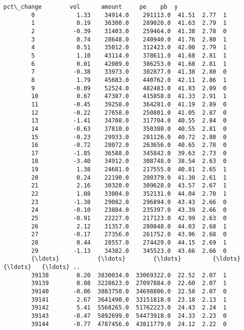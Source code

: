 \documentclass[11pt]{article}
\begin{document}
\begin{Verbatim}[commandchars=\\\{\}]
               pct\_change        vol      amount     pe    pb  y  
        0            1.33    34914.0    291113.0  41.51  2.77  1  
        1            0.19    36300.0    289020.0  41.63  2.79  1  
        2           -0.39    31403.0    259464.0  41.38  2.78  0  
        3            0.74    28648.0    240940.0  41.76  2.80  1  
        4            0.51    35012.0    312423.0  42.00  2.79  1  
        5            1.10    43114.0    378611.0  41.68  2.81  1  
        6            0.01    42089.0    386253.0  41.68  2.81  1  
        7           -0.38    33973.0    302877.0  41.38  2.80  0  
        8            1.79    45683.0    440762.0  42.11  2.86  1  
        9           -0.09    52524.0    482483.0  41.83  2.89  0  
        10           0.67    47387.0    415858.0  41.33  2.91  1  
        11          -0.45    39258.0    364281.0  41.19  2.89  0  
        12          -0.22    27658.0    250801.0  41.05  2.87  0  
        13          -1.41    34708.0    317704.0  40.55  2.84  0  
        14          -0.63    37810.0    350380.0  40.55  2.81  0  
        15          -0.23    29933.0    281126.0  40.72  2.80  0  
        16          -0.72    28072.0    263656.0  40.65  2.78  0  
        17          -1.85    36588.0    345842.0  39.63  2.73  0  
        18          -3.40    34912.0    308748.0  38.54  2.63  0  
        19           1.38    24681.0    217555.0  40.81  2.65  1  
        20           0.24    22190.0    200379.0  41.30  2.61  1  
        21           2.16    30320.0    309628.0  43.57  2.67  1  
        22           1.08    33004.0    352131.0  44.04  2.70  1  
        23          -1.38    29082.0    296894.0  43.43  2.66  0  
        24          -0.10    23884.0    235397.0  43.39  2.66  0  
        25          -0.91    22227.0    217123.0  42.99  2.63  0  
        26           2.12    31357.0    280848.0  44.03  2.68  1  
        27          -0.17    27356.0    261752.0  43.96  2.68  0  
        28           0.44    28557.0    274429.0  44.15  2.69  1  
        29          -1.13    34382.0    345523.0  43.66  2.66  0  
        {\ldots}           {\ldots}        {\ldots}         {\ldots}    {\ldots}   {\ldots} ..  
        39138        0.20  3830034.0  33069322.0  22.52  2.07  1  
        39139        0.08  3228623.0  27097884.0  22.60  2.07  1  
        39140       -0.06  3883750.0  34698806.0  22.58  2.07  0  
        39141        2.67  3641490.0  33151818.0  23.18  2.13  1  
        39142        5.41  5568265.0  51762223.0  24.43  2.24  1  
        39143       -0.47  5892699.0  54473918.0  24.33  2.23  0  
        39144       -0.77  4787456.0  43811779.0  24.12  2.22  0  

\end{Verbatim}
\end{document}
